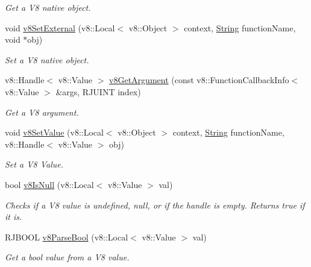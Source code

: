 \begin{DoxyCompactItemize}
\begin{DoxyCompactList}\small\item\em Get a V8 native object. \end{DoxyCompactList}\item 
void \mbox{\hyperlink{class_rad_j_a_v_1_1_v8_javascript_engine_a5ebb5a5ca3ff577e0f32b16eb36827de}{v8\+Set\+External}} (v8\+::\+Local$<$ v8\+::\+Object $>$ context, \mbox{\hyperlink{class_rad_j_a_v_1_1_string}{String}} function\+Name, void $\ast$obj)
\begin{DoxyCompactList}\small\item\em Set a V8 native object. \end{DoxyCompactList}\item 
v8\+::\+Handle$<$ v8\+::\+Value $>$ \mbox{\hyperlink{class_rad_j_a_v_1_1_v8_javascript_engine_abbbd4c175913d3f27ee78d5a9a695571}{v8\+Get\+Argument}} (const v8\+::\+Function\+Callback\+Info$<$ v8\+::\+Value $>$ \&args, R\+J\+U\+I\+NT index)
\begin{DoxyCompactList}\small\item\em Get a V8 argument. \end{DoxyCompactList}\item 
void \mbox{\hyperlink{class_rad_j_a_v_1_1_v8_javascript_engine_a8d4bf88adc107aab88240b3bf1506593}{v8\+Set\+Value}} (v8\+::\+Local$<$ v8\+::\+Object $>$ context, \mbox{\hyperlink{class_rad_j_a_v_1_1_string}{String}} function\+Name, v8\+::\+Handle$<$ v8\+::\+Value $>$ obj)
\begin{DoxyCompactList}\small\item\em Set a V8 Value. \end{DoxyCompactList}\item 
bool \mbox{\hyperlink{class_rad_j_a_v_1_1_v8_javascript_engine_a4a972f2fd1b201f4c1d71926a6db0a56}{v8\+Is\+Null}} (v8\+::\+Local$<$ v8\+::\+Value $>$ val)
\begin{DoxyCompactList}\small\item\em Checks if a V8 value is undefined, null, or if the handle is empty. Returns true if it is. \end{DoxyCompactList}\item 
R\+J\+B\+O\+OL \mbox{\hyperlink{class_rad_j_a_v_1_1_v8_javascript_engine_a37593cc12296ff07e31b6f12d5aa2514}{v8\+Parse\+Bool}} (v8\+::\+Local$<$ v8\+::\+Value $>$ val)
\begin{DoxyCompactList}\small\item\em Get a bool value from a V8 value. \end{DoxyCompactList}\item 

\end{DoxyCompactItemize}
